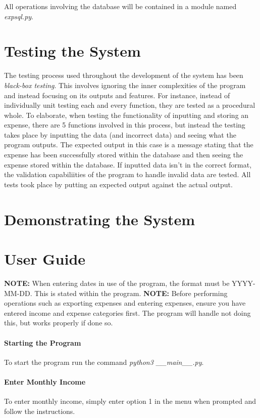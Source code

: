 \documentclass[11pt]{article}
\begin{document}
  All operations involving the database will be contained in a module named \textit{expsql.py}.

  \section{Testing the System}
  The testing process used throughout the development of the system has been \textit{black-box testing}. This involves ignoring the inner complexities of the program and instead focusing on its outputs and features. For instance, instead of individually unit testing each and every function, they are tested as a procedural whole. To elaborate, when testing the functionality of inputting and storing an expense, there are 5 functions involved in this process, but instead the testing takes place by inputting the data (and incorrect data) and seeing what the program outputs. The expected output in this case is a message stating that the expense has been successfully stored within the database and then seeing the expense stored within the database. If inputted data isn't in the correct format, the validation capabiliities of the program to handle invalid data are tested. All tests took place by putting an expected output against the actual output.
  \section{Demonstrating the System}

  \appendix
  \section{User Guide}
  \textbf{NOTE:} When entering dates in use of the program, the format must be YYYY-MM-DD. This is stated within the program.
  \textbf{NOTE:} Before performing operations such as exporting expenses and entering expenses, ensure you have entered income and expense categories first. The program will handle not doing this, but works properly if done so.
  \paragraph{Starting the Program} To start the program run the command \textit{python3 \_\_main\_\_.py}. 
  \paragraph{Enter Monthly Income}
  To enter monthly income, simply enter option 1 in the menu when prompted and follow the instructions.
\end{document}
